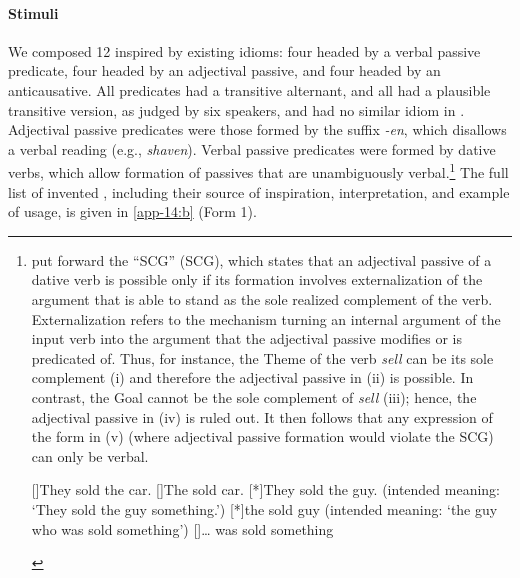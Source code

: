 \documentclass[output=paper]{langsci/langscibook}
\begin{document}
\paragraph*{Stimuli} We composed 12   inspired by existing
 idioms: four headed by a verbal passive predicate,
four headed by an
adjectival passive, and four headed by an anticausative. All predicates had a
transitive alternant, and all  had a plausible transitive version,
as judged by six speakers, and had no similar idiom in . Adjectival
passive predicates were those formed by the suffix \emph{-en}, which disallows
a verbal reading (e.g., \emph{shaven}). Verbal passive predicates were formed
by dative verbs, which allow formation of passives that are unambiguously
verbal.\footnote{\textcite{LevRap1986} put forward the \enquote{\glsdesc{SCG}}
    (\gls{SCG}), which states that an adjectival passive of a
    dative verb is possible only if its formation involves externalization of
    the argument that is able to stand as the sole realized complement of the
    verb.  Externalization refers to the mechanism turning an internal argument
    of the input verb into the argument that the adjectival passive modifies or
    is predicated of.  Thus, for instance, the Theme of the verb \emph{sell}
    can be its sole complement (i) and therefore the adjectival passive in (ii)
    is possible. In contrast, the Goal cannot be the sole complement of
    \emph{sell} (iii); hence, the adjectival passive in (iv) is ruled out. It
    then follows that any expression of the form in (v) (where adjectival
    passive formation would violate the \gls{SCG}) can only be verbal.

    \begin{exe}

        []{They sold the car.}
        []{The sold car.}
        [*]{They sold the guy. (intended meaning: \enquote*{They
        sold the guy something.})}
        [*]{the sold guy (intended meaning: \enquote*{the guy who was
        sold something})}
        []{\dots{} was sold something}

    \end{exe}} The full list of invented , including their 
    source of inspiration, interpretation, and example of usage, is given in
    \ref{app-14:b} (Form 1).
\end{document}
